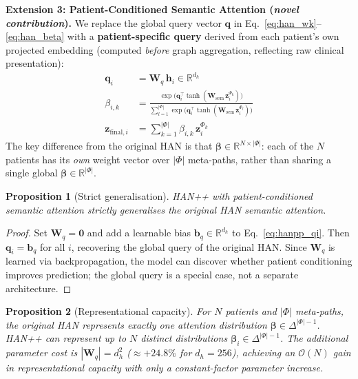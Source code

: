 \documentclass[conference]{IEEEtran}
\newtheorem{proposition}{Proposition}
\begin{document}
\textbf{Extension 3: Patient-Conditioned Semantic Attention
(\emph{novel contribution}).}
We replace the global query vector $\mathbf{q}$ in
Eq.~\eqref{eq:han_wk}--\eqref{eq:han_beta} with a
\textbf{patient-specific query} derived from each patient's own
projected embedding (computed \emph{before} graph aggregation,
reflecting raw clinical presentation):
\begin{align}
  \mathbf{q}_i &= \mathbf{W}_q\, \mathbf{h}_i \in \mathbb{R}^{d_h}
  \label{eq:hanpp_qi} \\
  \beta_{i,k} &= \frac{
    \exp\bigl(\mathbf{q}_i^{\top}
    \tanh(\mathbf{W}_{\text{sem}}\, \mathbf{z}_i^{\Phi_k})\bigr)
  }{
    \sum_{l=1}^{|\Phi|} \exp\bigl(\mathbf{q}_i^{\top}
    \tanh(\mathbf{W}_{\text{sem}}\, \mathbf{z}_i^{\Phi_l})\bigr)
  }
  \label{eq:hanpp_beta} \\
  \mathbf{z}_{\text{final},i} &= \sum_{k=1}^{|\Phi|}
    \beta_{i,k}\, \mathbf{z}_i^{\Phi_k}
  \label{eq:hanpp_zfinal}
\end{align}
The key difference from the original HAN is that
$\boldsymbol{\beta} \in \mathbb{R}^{N \times |\Phi|}$:
each of the $N$ patients has its \emph{own} weight vector over
$|\Phi|$ meta-paths, rather than sharing a single global
$\boldsymbol{\beta} \in \mathbb{R}^{|\Phi|}$.

\begin{proposition}[Strict generalisation]
\label{prop:generalisation}
HAN++ with patient-conditioned semantic attention strictly generalises
the original HAN semantic attention.
\end{proposition}

\begin{proof}
Set $\mathbf{W}_q = \mathbf{0}$ and add a learnable bias
$\mathbf{b}_q \in \mathbb{R}^{d_h}$ to Eq.~\eqref{eq:hanpp_qi}.
Then $\mathbf{q}_i = \mathbf{b}_q$ for all $i$, recovering the global
query of the original HAN.
Since $\mathbf{W}_q$ is learned via backpropagation, the model
can discover whether patient conditioning improves prediction;
the global query is a special case, not a separate architecture.
\end{proof}

\begin{proposition}[Representational capacity]
\label{prop:capacity}
For $N$ patients and $|\Phi|$ meta-paths, the original HAN
represents exactly one attention distribution
$\boldsymbol{\beta} \in \Delta^{|\Phi|-1}$.
HAN++ can represent up to $N$ distinct distributions
$\boldsymbol{\beta}_i \in \Delta^{|\Phi|-1}$.
The additional parameter cost is
$|\mathbf{W}_q| = d_h^2$ ($\approx +24.8\%$ for $d_h = 256$),
achieving an $\mathcal{O}(N)$ gain in representational capacity
with only a constant-factor parameter increase.
\end{proposition}
\end{document}
